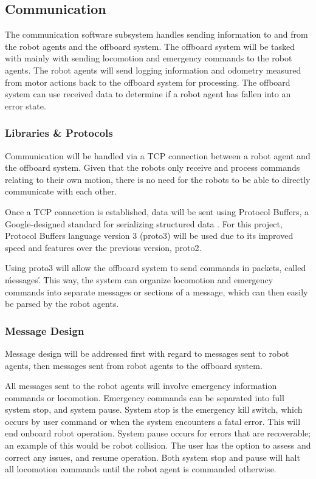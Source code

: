 
\subsection{Communication}
\label{sec:software_comm}

The communication software subsystem handles sending information to and from the robot agents and the offboard system. The offboard system will be tasked with mainly with sending locomotion and emergency commands to the robot agents. The robot agents will send logging information and odometry measured from motor actions back to the offboard system for processing. The offboard system can use received data to determine if a robot agent has fallen into an error state.

\subsubsection{Libraries \& Protocols}
\label{sec:software_comm_libs}
Communication will be handled via a TCP connection between a robot agent and the offboard system. Given that the robots only receive and process commands relating to their own motion, there is no need for the robots to be able to directly communicate with each other. 

Once a TCP connection is established, data will be sent using Protocol Buffers, a Google-designed standard for serializing structured data \cite{protobuf3}. For this project, Protocol Buffers language version 3 (proto3) will be used due to its improved speed and features over the previous version, proto2. 

Using proto3 will allow the offboard system to send commands in packets, called \'messages\'. This way, the system can organize locomotion and emergency commands into separate messages or sections of a message, which can then easily be parsed by the robot agents. 

\subsubsection{Message Design}
\label{sec:software_comm_msg}
Message design will be addressed first with regard to messages sent to robot agents, then messages sent from robot agents to the offboard system.

All messages sent to the robot agents will involve emergency information commands or locomotion. Emergency commands can be separated into full system stop, and system pause. System stop is the emergency kill switch, which occurs by user command or when the system encounters a fatal error. This will end onboard robot operation. System pause occurs for errors that are recoverable; an example of this would be robot collision. The user has the option to assess and correct any issues, and resume operation. Both system stop and pause will halt all locomotion commands until the robot agent is commanded otherwise.

